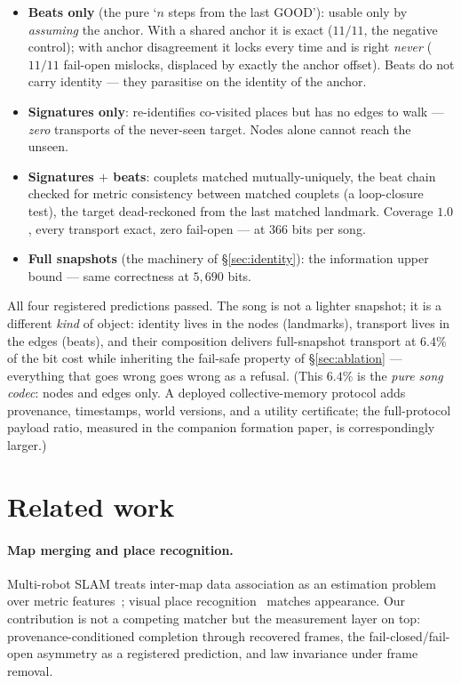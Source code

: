 \documentclass{article}
\begin{document}
\begin{itemize}[leftmargin=16pt,itemsep=2pt,topsep=2pt]
\item \textbf{Beats only} (the pure `$n$ steps from the last GOOD'):
  usable only by \emph{assuming} the anchor. With a shared anchor it
  is exact ($11/11$, the negative control); with anchor disagreement
  it locks every time and is right \emph{never} ($11/11$ fail-open
  mislocks, displaced by exactly the anchor offset). Beats do not
  carry identity --- they parasitise on the identity of the anchor.
\item \textbf{Signatures only}: re-identifies co-visited places but
  has no edges to walk --- \emph{zero} transports of the never-seen
  target. Nodes alone cannot reach the unseen.
\item \textbf{Signatures $+$ beats}: couplets matched mutually-uniquely,
  the beat chain checked for metric consistency between matched
  couplets (a loop-closure test), the target dead-reckoned from the
  last matched landmark. Coverage $1.0$, every transport exact, zero
  fail-open --- at $366$ bits per song.
\item \textbf{Full snapshots} (the machinery of
  \S\ref{sec:identity}): the information upper bound --- same
  correctness at $5{,}690$ bits.
\end{itemize}

All four registered predictions passed. The song is not a lighter
snapshot; it is a different \emph{kind} of object: identity lives in
the nodes (landmarks), transport lives in the edges (beats), and
their composition delivers full-snapshot transport at $6.4\%$ of the
bit cost while inheriting the fail-safe property of
\S\ref{sec:ablation} --- everything that goes wrong goes wrong as a
refusal. (This $6.4\%$ is the \emph{pure song codec}: nodes and
edges only. A deployed collective-memory protocol adds provenance,
timestamps, world versions, and a utility certificate; the
full-protocol payload ratio, measured in the companion formation
paper, is correspondingly larger.)

\section{Related work}
\label{sec:related}

\paragraph{Map merging and place recognition.} Multi-robot SLAM
treats inter-map data association as an estimation problem over
metric features~\cite{cadena2016slam}; visual place
recognition~\cite{lowry2016vpr} matches appearance. Our contribution
is not a competing matcher but the measurement layer on top:
provenance-conditioned completion through recovered frames, the
fail-closed/fail-open asymmetry as a registered prediction, and law
invariance under frame removal.
\end{document}
